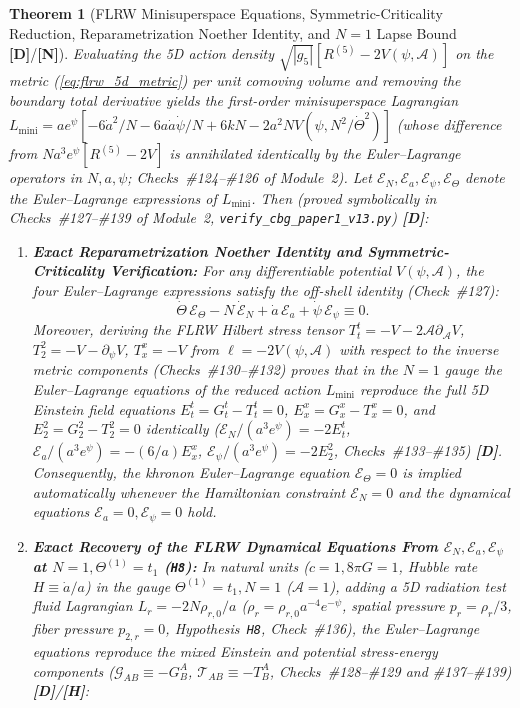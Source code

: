 \documentclass[11pt,a4paper]{article}
\newcommand{\catD}{\textbf{\textcolor{blue!75!black}{[D]}}}
\newcommand{\catH}{\textbf{\textcolor{orange!85!black}{[H]}}}
\newcommand{\catN}{\textbf{\textcolor{teal!75!black}{[N]}}}
\newtheorem{theorem}{Theorem}[section]
\theoremstyle{definition}
\theoremstyle{remark}
\begin{document}
\begin{theorem}[FLRW Minisuperspace Equations, Symmetric-Criticality Reduction, Reparametrization Noether Identity, and $N = 1$ Lapse Bound \catD/\catN]
\label{thm:flrw_action_noether}
Evaluating the 5D action density $\sqrt{|g_5|}[R^{(5)} - 2V(\psi, \mathcal{A})]$ on the metric (\ref{eq:flrw_5d_metric}) per unit comoving volume and removing the boundary total derivative yields the first-order minisuperspace Lagrangian $L_{\text{mini}} = a e^{\psi}[-6\dot{a}^2/N - 6a\dot{a}\dot{\psi}/N + 6kN - 2a^2 N V(\psi, N^2/\dot{\Theta}^2)]$ (whose difference from $N a^3 e^{\psi}[R^{(5)} - 2V]$ is annihilated identically by the Euler--Lagrange operators in $N, a, \psi$; Checks~\#124--\#126 of Module~2). Let $\mathcal{E}_N, \mathcal{E}_a, \mathcal{E}_{\psi}, \mathcal{E}_{\Theta}$ denote the Euler--Lagrange expressions of $L_{\text{mini}}$. Then (proved symbolically in Checks~\#127--\#139 of Module~2, \texttt{verify\_cbg\_paper1\_v13.py}) \catD:
\begin{enumerate}
  \item[\textnormal{(a)}] \textbf{Exact Reparametrization Noether Identity and Symmetric-Criticality Verification:} For any differentiable potential $V(\psi, \mathcal{A})$, the four Euler--Lagrange expressions satisfy the off-shell identity (Check~\#127):
  \begin{equation}
    \dot{\Theta}\,\mathcal{E}_{\Theta} - N\,\dot{\mathcal{E}}_N + \dot{a}\,\mathcal{E}_a + \dot{\psi}\,\mathcal{E}_{\psi} \equiv 0.
    \label{eq:flrw_reparam_noether}
  \end{equation}
  Moreover, deriving the FLRW Hilbert stress tensor $T^t_t = -V - 2\mathcal{A}\partial_{\mathcal{A}}V$, $T^2_2 = -V - \partial_\psi V$, $T^x_x = -V$ from $\ell = -2V(\psi, \mathcal{A})$ with respect to the inverse metric components (Checks~\#130--\#132) proves that in the $N = 1$ gauge the Euler--Lagrange equations of the reduced action $L_{\text{mini}}$ reproduce the full 5D Einstein field equations $E^t_t = G^t_t - T^t_t = 0$, $E^x_x = G^x_x - T^x_x = 0$, and $E^2_2 = G^2_2 - T^2_2 = 0$ identically ($\mathcal{E}_N/(a^3 e^\psi) = -2E^t_t$, $\mathcal{E}_a/(a^3 e^\psi) = -(6/a)E^x_x$, $\mathcal{E}_\psi/(a^3 e^\psi) = -2E^2_2$, Checks~\#133--\#135) \catD. Consequently, the khronon Euler--Lagrange equation $\mathcal{E}_{\Theta} = 0$ is implied automatically whenever the Hamiltonian constraint $\mathcal{E}_N = 0$ and the dynamical equations $\mathcal{E}_a = 0, \mathcal{E}_{\psi} = 0$ hold.
  \item[\textnormal{(b)}] \textbf{Exact Recovery of the FLRW Dynamical Equations From $\mathcal{E}_N, \mathcal{E}_a, \mathcal{E}_\psi$ at $N = 1, \Theta^{(1)} = t_1$ (\texttt{H8}):} In natural units ($c = 1, 8\pi G = 1$, Hubble rate $H \equiv \dot{a}/a$) in the gauge $\Theta^{(1)} = t_1, N = 1$ ($\mathcal{A} = 1$), adding a 5D radiation test fluid Lagrangian $L_r = -2N\rho_{r,0}/a$ ($\rho_r = \rho_{r,0}a^{-4}e^{-\psi}$, spatial pressure $p_r = \rho_r/3$, fiber pressure $p_{2,r} = 0$, Hypothesis~\texttt{H8}, Check~\#136), the Euler--Lagrange equations reproduce the mixed Einstein and potential stress-energy components ($\mathcal{G}_{AB} \equiv -G^A_B$, $\mathcal{T}_{AB} \equiv -T^A_B$, Checks~\#128--\#129 and \#137--\#139) \catD/\catH:

\end{enumerate}
\end{theorem}
\end{document}
